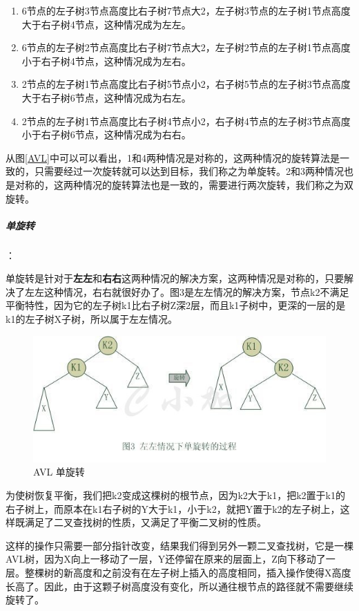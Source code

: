 \documentclass[UTF8,a4paper,12pt]{ctexbook}
\begin{document}
			\begin{enumerate}[itemindent = 1em,label = (\arabic{enumi})]
				\item  6节点的左子树3节点高度比右子树7节点大2，左子树3节点的左子树1节点高度大于右子树4节点，这种情况成为左左。
				\item  6节点的左子树2节点高度比右子树7节点大2，左子树2节点的左子树1节点高度小于右子树4节点，这种情况成为左右。
				\item  2节点的左子树1节点高度比右子树5节点小2，右子树5节点的左子树3节点高度大于右子树6节点，这种情况成为右左。
				\item  2节点的左子树1节点高度比右子树4节点小2，右子树4节点的左子树3节点高度小于右子树6节点，这种情况成为右右。
			\end{enumerate}
			
			从图\ref{AVL}中可以可以看出，1和4两种情况是对称的，这两种情况的旋转算法是一致的，只需要经过一次旋转就可以达到目标，我们称之为单旋转。2和3两种情况也是对称的，这两种情况的旋转算法也是一致的，需要进行两次旋转，我们称之为双旋转。
				
			\subparagraph{单旋转}：
			
				单旋转是针对于\textbf{左左}和\textbf{右右}这两种情况的解决方案，这两种情况是对称的，只要解决了左左这种情况，右右就很好办了。图3是左左情况的解决方案，节点k2不满足平衡特性，因为它的左子树k1比右子树Z深2层，而且k1子树中，更深的一层的是k1的左子树X子树，所以属于左左情况。
					\begin{figure}[h]
						\centering
						\includegraphics[scale = 0.8]{Rotate_1.jpg}
						\caption{AVL 单旋转}
					\end{figure}
					
				为使树恢复平衡，我们把k2变成这棵树的根节点，因为k2大于k1，把k2置于k1的右子树上，而原本在k1右子树的Y大于k1，小于k2，就把Y置于k2的左子树上，这样既满足了二叉查找树的性质，又满足了平衡二叉树的性质。
				
				这样的操作只需要一部分指针改变，结果我们得到另外一颗二叉查找树，它是一棵AVL树，因为X向上一移动了一层，Y还停留在原来的层面上，Z向下移动了一层。整棵树的新高度和之前没有在左子树上插入的高度相同，插入操作使得X高度长高了。因此，由于这颗子树高度没有变化，所以通往根节点的路径就不需要继续旋转了。
					
\end{document}
